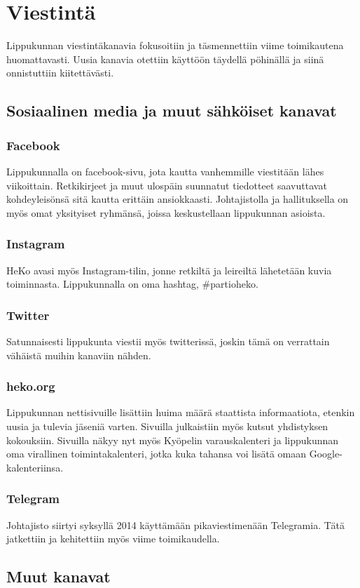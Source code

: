 \section{Viestintä}
Lippukunnan viestintäkanavia fokusoitiin ja täsmennettiin viime toimikautena huomattavasti. Uusia kanavia otettiin käyttöön täydellä pöhinällä ja siinä onnistuttiin kiitettävästi.
\subsection{Sosiaalinen media ja muut sähköiset kanavat}
\subsubsection{Facebook}
Lippukunnalla on facebook-sivu, jota kautta vanhemmille viestitään lähes viikoittain. Retkikirjeet ja muut ulospäin suunnatut tiedotteet saavuttavat kohdeyleisönsä sitä kautta erittäin ansiokkaasti. Johtajistolla ja hallituksella on myös omat yksityiset ryhmänsä, joissa keskustellaan lippukunnan asioista.
\subsubsection{Instagram}
HeKo avasi myös Instagram-tilin, jonne retkiltä ja leireiltä lähetetään kuvia toiminnasta. Lippukunnalla on oma hashtag, \#partioheko.
\subsubsection{Twitter}
Satunnaisesti lippukunta viestii myös twitterissä, joskin tämä on verrattain vähäistä muihin kanaviin nähden.
\subsubsection{heko.org}
Lippukunnan nettisivuille lisättiin huima määrä staattista informaatiota, etenkin uusia ja tulevia jäseniä varten. Sivuilla julkaistiin myös kutsut yhdistyksen kokouksiin. Sivuilla näkyy nyt myös Kyöpelin varauskalenteri ja lippukunnan oma virallinen toimintakalenteri, jotka kuka tahansa voi lisätä omaan Google-kalenteriinsa.
\subsubsection{Telegram}
Johtajisto siirtyi syksyllä 2014 käyttämään pikaviestimenään Telegramia. Tätä jatkettiin ja kehitettiin myös viime toimikaudella.
\subsection{Muut kanavat}
